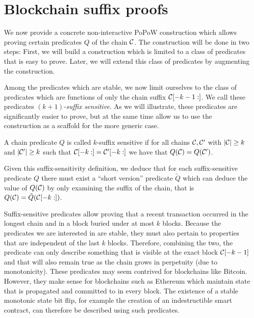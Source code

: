 \section{Blockchain suffix proofs}

We now provide a concrete non-interactive PoPoW construction which allows
proving certain predicates $Q$ of the chain $\mathcal{C}$. The construction will
be done in two steps: First, we will build a construction which is limited to
a class of predicates that is easy to prove. Later, we will extend this class
of predicates by augmenting the construction.

Among the predicates which are stable, we now limit ourselves to the class of
predicates which are functions of only the chain suffix $\mathcal{C}[-k - 1:]$. We
call these predicates $(k+1)$-\textit{suffix sensitive}. As we will illustrate,
these predicates are significantly easier to prove, but at the same time allow
us to use the construction as a scaffold for the more generic case.

\begin{definition}
A chain predicate $Q$ is called $k$-\textnormal{suffix sensitive} if for all
chains $\mathcal{C}, \mathcal{C}'$ with $|\mathcal{C}| \geq k$ and $|\mathcal{C}'| \geq k$ such that
$\mathcal{C}[-k:] = \mathcal{C}'[-k:]$ we have that $Q(\mathcal{C}) = Q(\mathcal{C}')$.
\end{definition}

Given this suffix-sensitivity definition, we deduce that for each
suffix-sensitive predicate $Q$ there must exist a ``short version'' predicate
$\tilde{Q}$ which can deduce the value of $Q(\mathcal{C})$ by only examining the
suffix of the chain, that is $Q(\mathcal{C}) = \tilde{Q}(\mathcal{C}[-k:])$.

Suffix-sensitive predicates allow proving that a recent transaction occurred in
the longest chain and in a block buried under at most $k$ blocks. Because
the predicates we are interested in are stable, they must also pertain to
properties that are independent of the last $k$ blocks. Therefore, combining the
two, the predicate can only describe something that is visible at the exact
block $\mathcal{C}[-k-1]$ and that will also remain true as the chain grows in
perpetuity (due to monotonicity). These predicates may seem contrived for
blockchains like Bitcoin. However, they make sense for blockchains such as
Ethereum which maintain state \cite{vitalik} that is propagated and committed to
in every block. The existence of a stable monotonic state bit flip, for example
the creation of an indestructible smart contract, can therefore be described
using such predicates.

